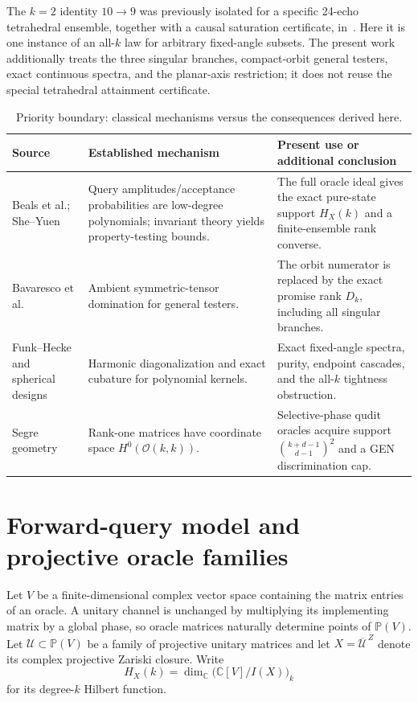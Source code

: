 \documentclass[11pt]{article}
\theoremstyle{definition}
\theoremstyle{remark}
\newcommand{\C}{\mathbb C}
\newcommand{\PP}{\mathbb P}
\begin{document}
The $k=2$ identity $10\to9$ was previously isolated for a specific
24-echo tetrahedral ensemble, together with a causal saturation certificate,
in~\cite{eriksson2026echo}.  Here it is one instance of an all-$k$ law for
arbitrary fixed-angle subsets.  The present work additionally treats the
three singular branches, compact-orbit general testers, exact continuous
spectra, and the planar-axis restriction; it does not reuse the special
tetrahedral attainment certificate.

\begin{table}[t]
\centering
\small
\caption{Priority boundary: classical mechanisms versus the consequences
derived here.}
\label{tab:priority}
\begin{tabular}{@{}p{}p{}p{}@{}}
\toprule
Source & Established mechanism & Present use or additional conclusion \\
\midrule
Beals et al.; She--Yuen & Query amplitudes/acceptance probabilities are
low-degree polynomials; invariant theory yields property-testing bounds. &
The full oracle ideal gives the exact pure-state support $H_X(k)$ and a
finite-ensemble rank converse. \\
Bavaresco et al. & Ambient symmetric-tensor domination for general testers. &
The orbit numerator is replaced by the exact promise rank $D_k$, including
all singular branches. \\
Funk--Hecke and spherical designs & Harmonic diagonalization and exact
cubature for polynomial kernels. & Exact fixed-angle spectra, purity,
endpoint cascades, and the all-$k$ tightness obstruction. \\
Segre geometry & Rank-one matrices have coordinate space
$H^0(\mathcal O(k,k))$. & Selective-phase qudit oracles acquire support
$\binom{k+d-1}{d-1}^2$ and a GEN discrimination cap. \\
\bottomrule
\end{tabular}
\end{table}

\section{Forward-query model and projective oracle families}

Let $V$ be a finite-dimensional complex vector space containing the matrix
entries of an oracle.  A unitary channel is unchanged by multiplying its
implementing matrix by a global phase, so oracle matrices naturally determine
points of $\PP(V)$.  Let $\mathcal U\subset\PP(V)$ be a family of projective
unitary matrices and let $X=\overline{\mathcal U}^{\,Z}$ denote its complex
projective Zariski closure.  Write
\begin{equation}
 H_X(k)=\dim_\C\bigl(\C[V]/I(X)\bigr)_k
\end{equation}
for its degree-$k$ Hilbert function.
\end{document}
